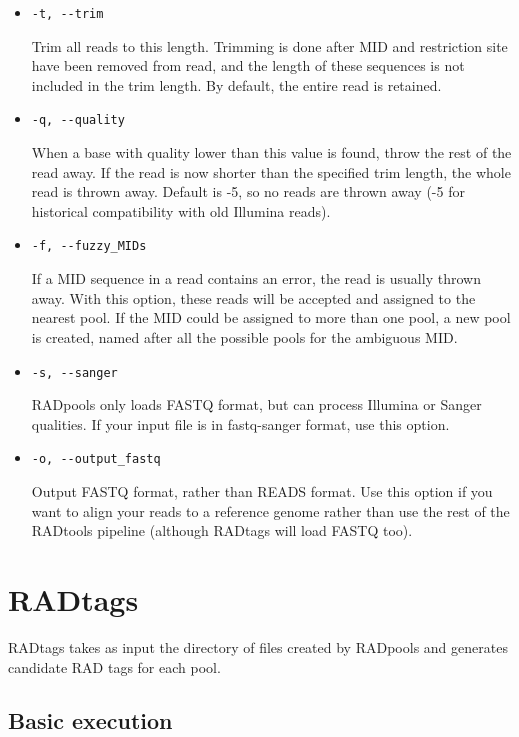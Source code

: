 \documentclass[a4paper]{article}
\begin{document}
\begin{itemize}
    \item \verb|-t, --trim|
    
    Trim all reads to this length. Trimming is done after MID and restriction site have been removed from read, and the length of these sequences is not included in the trim length. By default, the entire read is retained.

    \item \verb|-q, --quality|
    
    When a base with quality lower than this value is found, throw the rest of the read away. If the read is now shorter than the specified trim length, the whole read is thrown away. Default is -5, so no reads are thrown away (-5 for historical compatibility with old Illumina reads).

    \item \verb|-f, --fuzzy_MIDs|
    
    If a MID sequence in a read contains an error, the read is usually thrown away. With this option, these reads will be accepted and assigned to the nearest pool. If the MID could be assigned to more than one pool, a new pool is created, named after all the possible pools for the ambiguous MID.

    \item \verb|-s, --sanger|
    
    RADpools only loads FASTQ format, but can process Illumina or Sanger qualities. If your input file is in fastq-sanger format, use this option.

    \item \verb|-o, --output_fastq|
    
    Output FASTQ format, rather than READS format. Use this option if you want to align your reads to a reference genome rather than use the rest of the RADtools pipeline (although RADtags will load FASTQ too).

\end{itemize}


\section{RADtags}

RADtags takes as input the directory of files created by RADpools and generates candidate RAD tags for each pool.

\subsection{Basic execution}
\end{document}
